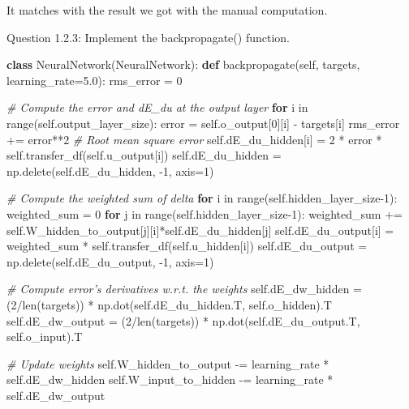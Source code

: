 \documentclass[11pt]{article}
\newenvironment{Shaded}{}{}
\newcommand{\KeywordTok}[1]{\textcolor[rgb]{0.00,0.44,0.13}{\textbf{{#1}}}}
\newcommand{\DataTypeTok}[1]{\textcolor[rgb]{0.56,0.13,0.00}{{#1}}}
\newcommand{\DecValTok}[1]{\textcolor[rgb]{0.25,0.63,0.44}{{#1}}}
\newcommand{\FloatTok}[1]{\textcolor[rgb]{0.25,0.63,0.44}{{#1}}}
\newcommand{\CommentTok}[1]{\textcolor[rgb]{0.38,0.63,0.69}{\textit{{#1}}}}
\newcommand{\OtherTok}[1]{\textcolor[rgb]{0.00,0.44,0.13}{{#1}}}
\newcommand{\NormalTok}[1]{{#1}}
\begin{document}
    It matches with the result we got with the manual computation.

    Question 1.2.3: Implement the backpropagate() function.

    \begin{Shaded}
\begin{Highlighting}[]
\KeywordTok{class} \NormalTok{NeuralNetwork(NeuralNetwork):}
    \KeywordTok{def} \NormalTok{backpropagate(}\OtherTok{self}\NormalTok{, targets, learning_rate=}\FloatTok{5.0}\NormalTok{):}
        \NormalTok{rms_error = }\DecValTok{0}
        
        \CommentTok{# Compute the error and dE_du at the output layer}
        \KeywordTok{for} \NormalTok{i in }\DataTypeTok{range}\NormalTok{(}\OtherTok{self}\NormalTok{.output_layer_size):}
            \NormalTok{error = }\OtherTok{self}\NormalTok{.o_output[}\DecValTok{0}\NormalTok{][i] - targets[i]}
            \NormalTok{rms_error += error**}\DecValTok{2} \CommentTok{# Root mean square error}
            \OtherTok{self}\NormalTok{.dE_du_hidden[i] = }\DecValTok{2} \NormalTok{* error * }\OtherTok{self}\NormalTok{.transfer_df(}\OtherTok{self}\NormalTok{.u_output[i])}
        \OtherTok{self}\NormalTok{.dE_du_hidden = np.delete(}\OtherTok{self}\NormalTok{.dE_du_hidden, -}\DecValTok{1}\NormalTok{, axis=}\DecValTok{1}\NormalTok{)}
        
        \CommentTok{# Compute the weighted sum of delta}
        \KeywordTok{for} \NormalTok{i in }\DataTypeTok{range}\NormalTok{(}\OtherTok{self}\NormalTok{.hidden_layer_size}\DecValTok{-1}\NormalTok{):}
            \NormalTok{weighted_sum = }\DecValTok{0}
            \KeywordTok{for} \NormalTok{j in }\DataTypeTok{range}\NormalTok{(}\OtherTok{self}\NormalTok{.hidden_layer_size}\DecValTok{-1}\NormalTok{):}
                \NormalTok{weighted_sum += }\OtherTok{self}\NormalTok{.W_hidden_to_output[j][i]*}\OtherTok{self}\NormalTok{.dE_du_hidden[j]}
            \OtherTok{self}\NormalTok{.dE_du_output[i] = weighted_sum * }\OtherTok{self}\NormalTok{.transfer_df(}\OtherTok{self}\NormalTok{.u_hidden[i])}
            \OtherTok{self}\NormalTok{.dE_du_output = np.delete(}\OtherTok{self}\NormalTok{.dE_du_output, -}\DecValTok{1}\NormalTok{, axis=}\DecValTok{1}\NormalTok{)}
        
        \CommentTok{# Compute error's derivatives w.r.t. the weights}
        \OtherTok{self}\NormalTok{.dE_dw_hidden = (}\DecValTok{2}\NormalTok{/}\DataTypeTok{len}\NormalTok{(targets)) * np.dot(}\OtherTok{self}\NormalTok{.dE_du_hidden.T, }\OtherTok{self}\NormalTok{.o_hidden).T}
        \OtherTok{self}\NormalTok{.dE_dw_output = (}\DecValTok{2}\NormalTok{/}\DataTypeTok{len}\NormalTok{(targets)) * np.dot(}\OtherTok{self}\NormalTok{.dE_du_output.T, }\OtherTok{self}\NormalTok{.o_input).T}
        
        \CommentTok{# Update weights}
        \OtherTok{self}\NormalTok{.W_hidden_to_output -= learning_rate * }\OtherTok{self}\NormalTok{.dE_dw_hidden}
        \OtherTok{self}\NormalTok{.W_input_to_hidden -= learning_rate * }\OtherTok{self}\NormalTok{.dE_dw_output}
\end{Highlighting}
\end{Shaded}
\end{document}
